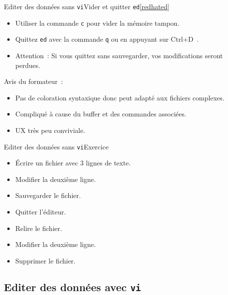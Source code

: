 \documentclass{beamer}
\begin{document}
    \begin{frame}{Editer des données sans \lstinline{vi}}{Vider et quitter \lstinline{ed}\cref{redhated}}
        \begin{itemize}
            \item Utiliser la commande \lstinline{c} pour vider la mémoire tampon.
            \item Quittez \lstinline{ed} avec la commande \lstinline{q} ou en appuyant sur Ctrl+D~.
            \item Attention~: Si vous quittez sans sauvegarder, vos modifications seront perdues.
        \end{itemize}
        \begin{dangercolorbox}
            Avis du formateur~:
            \begin{itemize}
                \item Pas de coloration syntaxique donc peut adapté aux fichiers complexes.
                \item Compliqué à cause du buffer et des commandes associées.
                \item UX très peu conviviale.
            \end{itemize}
        \end{dangercolorbox}
    \end{frame}

    \begin{frame}{Editer des données sans \lstinline{vi}}{Exercice \execcounterdispinc}
        \begin{itemize}
            \item Écrire un fichier avec 3 lignes de texte.
            \item Modifier la deuxième ligne.
            \item Sauvegarder le fichier.
            \item Quitter l'éditeur.
            \item Relire le fichier.
            \item Modifier la deuxième ligne.
            \item Supprimer le fichier.
        \end{itemize}
    \end{frame}

    \subsection{Editer des données avec \lstinline{vi}}\label{subsec:edit-whith-vi}
\end{document}
